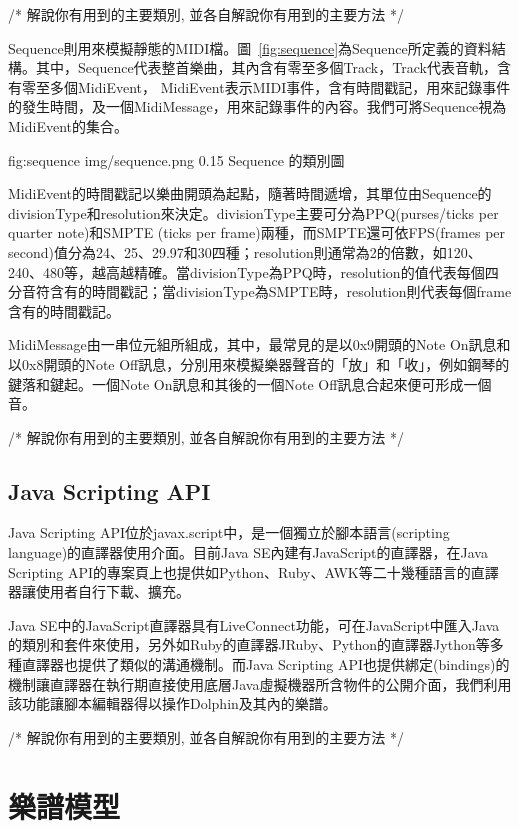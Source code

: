 \documentclass[12pt,a4paper,oneside]{report}
\begin{document}
/*
     解說你有用到的主要類別, 並各自解說你有用到的主要方法
*/




Sequence則用來模擬靜態的MIDI檔。圖~\ref{fig:sequence}為Sequence所定義的資料結構。其中，Sequence代表整首樂曲，其內含有零至多個Track，Track代表音軌，含有零至多個MidiEvent， MidiEvent表示MIDI事件，含有時間戳記，用來記錄事件的發生時間，及一個MidiMessage，用來記錄事件的內容。我們可將Sequence視為MidiEvent的集合。

\figurewithcaption
{fig:sequence}
{img/sequence.png}
{0.15}
{Sequence 的類別圖}

MidiEvent的時間戳記以樂曲開頭為起點，隨著時間遞增，其單位由Sequence的divisionType和resolution來決定。divisionType主要可分為PPQ(purses/ticks per quarter note)和SMPTE (ticks per frame)兩種，而SMPTE還可依FPS(frames per second)值分為24、25、29.97和30四種；resolution則通常為2的倍數，如120、240、480等，越高越精確。當divisionType為PPQ時，resolution的值代表每個四分音符含有的時間戳記；當divisionType為SMPTE時，resolution則代表每個frame含有的時間戳記。

MidiMessage由一串位元組所組成，其中，最常見的是以0x9開頭的Note On訊息和以0x8開頭的Note Off訊息，分別用來模擬樂器聲音的「放」和「收」，例如鋼琴的鍵落和鍵起。一個Note On訊息和其後的一個Note Off訊息合起來便可形成一個音。

/*
     解說你有用到的主要類別, 並各自解說你有用到的主要方法
*/

\subsection{Java Scripting API}

Java Scripting API位於javax.script中，是一個獨立於腳本語言(scripting language)的直譯器使用介面。目前Java SE內建有JavaScript的直譯器，在Java Scripting API的專案頁上也提供如Python、Ruby、AWK等二十幾種語言的直譯器讓使用者自行下載、擴充。

Java SE中的JavaScript直譯器具有LiveConnect功能，可在JavaScript中匯入Java的類別和套件來使用，另外如Ruby的直譯器JRuby、Python的直譯器Jython等多種直譯器也提供了類似的溝通機制。而Java Scripting API也提供綁定(bindings)的機制讓直譯器在執行期直接使用底層Java虛擬機器所含物件的公開介面，我們利用該功能讓腳本編輯器得以操作Dolphin及其內的樂譜。

/*
     解說你有用到的主要類別, 並各自解說你有用到的主要方法
*/


\section{樂譜模型}
\end{document}

